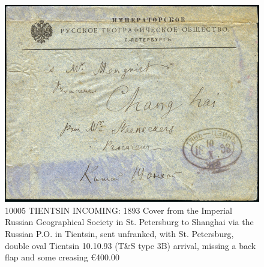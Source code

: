 \begin{figure}[htbp]
\centering
\includegraphics[width=.95\textwidth]{../russian-post-offices-in-china/10005.jpg}
\caption{
10005 TIENTSIN INCOMING: 1893 Cover from the Imperial Russian Geographical 
Society in St. Petersburg to Shanghai via the Russian P.O. in Tientsin, 
sent unfranked, with St. Petersburg, double oval Tientsin 10.10.93 (T\&S type 3B) arrival, missing a back flap and some creasing
\euro 400.00 
}  
\end{figure}

